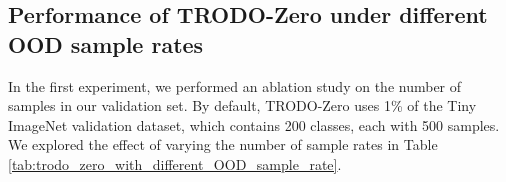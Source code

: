 

\subsection{Performance of TRODO-Zero under different OOD sample rates}
In the first experiment, we performed an ablation study on the number of samples in our validation set. By default, TRODO-Zero uses 1\% of the Tiny ImageNet validation dataset, which contains 200 classes, each with 500 samples. We explored the effect of varying the number of sample rates in Table \ref{tab:trodo_zero_with_different_OOD_sample_rate}.


\newpage